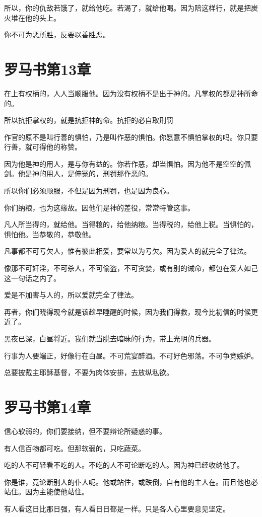 \documentclass[12pt,oneside]{book}
\begin{document}
所以，你的仇敌若饿了，就给他吃。若渴了，就给他喝。因为陪这样行，就是把炭火堆在他的头上。

你不可为恶所胜，反要以善胜恶。

\chapter{罗马书第13章}
在上有权柄的，人人当顺服他。因为没有权柄不是出于神的。凡掌权的都是神所命的。

所以抗拒掌权的，就是抗拒神的命。抗拒的必自取刑罚

作官的原不是叫行善的惧怕，乃是叫作恶的惧怕。你愿意不惧怕掌权的吗。你只要行善，就可得他的称赞。

因为他是神的用人，是与你有益的。你若作恶，却当惧怕。因为他不是空空的佩剑。他是神的用人，是伸冤的，刑罚那作恶的。

所以你们必须顺服，不但是因为刑罚，也是因为良心。

你们纳粮，也为这缘故。因他们是神的差役，常常特管这事。

凡人所当得的，就给他。当得粮的，给他纳粮。当得税的，给他上税。当惧怕的，惧怕他。当恭敬的，恭敬他。

凡事都不可亏欠人，惟有彼此相爱，要常以为亏欠。因为爱人的就完全了律法。

像那不可奸淫，不可杀人，不可偷盗，不可贪婪，或有别的诫命，都包在爱人如己这一句话之内了。

爱是不加害与人的，所以爱就完全了律法。

再者，你们晓得现今就是该趁早睡醒的时候，因为我们得救，现今比初信的时候更近了。

黑夜已深，白昼将近。我们就当脱去暗昧的行为，带上光明的兵器。

行事为人要端正，好像行在白昼。不可荒宴醉酒。不可好色邪荡。不可争竞嫉妒。

总要披戴主耶稣基督，不要为肉体安排，去放纵私欲。

\chapter{罗马书第14章}
信心软弱的，你们要接纳，但不要辩论所疑惑的事。

有人信百物都可吃。但那软弱的，只吃蔬菜。

吃的人不可轻看不吃的人。不吃的人不可论断吃的人。因为神已经收纳他了。

你是谁，竟论断别人的仆人呢。他或站住，或跌倒，自有他的主人在。而且他也必站住。因为主能使他站住。

有人看这日比那日强，有人看日日都是一样。只是各人心里要意见坚定。
\end{document}
